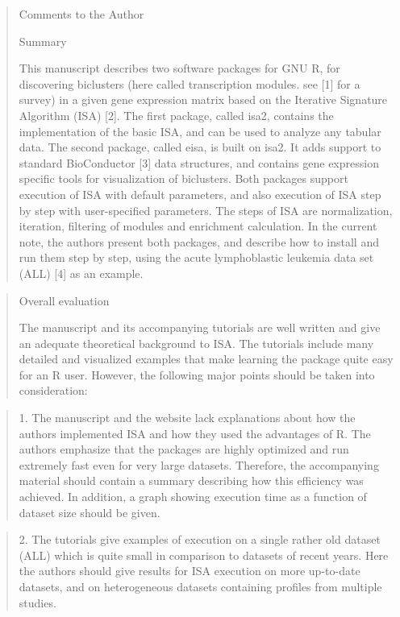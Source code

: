 \documentclass[a4paper]{article}
\begin{document}
\begin{quote}
Comments to the Author

Summary

This manuscript describes two software packages for GNU R, for
discovering biclusters (here called transcription modules. see [1] for
a survey) in a given gene expression matrix based on the Iterative
Signature Algorithm (ISA) [2]. The first package, called isa2,
contains the implementation of the basic ISA, and can be used to
analyze any tabular data. The second package, called eisa, is built on
isa2. It adds support to standard BioConductor [3] data structures,
and contains gene expression specific tools for visualization of
biclusters. Both packages support execution of ISA with default
parameters, and also execution of ISA step by step with user-specified
parameters. The steps of ISA are normalization, iteration, filtering
of modules and enrichment calculation. In the current note, the
authors present both packages, and describe how to install and run
them step by step, using the acute lymphoblastic leukemia data set
(ALL) [4] as an example. 
\end{quote}

\begin{quote}
Overall evaluation

The manuscript and its accompanying tutorials are well written and
give an adequate theoretical background to ISA. The tutorials include
many detailed and visualized examples that make learning the package
quite easy for an R user. However, the following major points should
be taken into consideration: 
\end{quote}

\begin{quote}
1.      The manuscript and the website lack explanations about how the
authors implemented ISA and how they used the advantages of R. The
authors emphasize that the packages are highly optimized and run
extremely fast even for very large datasets.  Therefore, the
accompanying material should contain a summary describing how this
efficiency was achieved. In addition, a graph showing execution time
as a function of dataset size should be given. 
\end{quote}

\begin{quote}
2.      The tutorials give examples of execution on a single rather
old dataset (ALL) which is quite small in comparison to datasets of
recent years. Here the authors should give results for ISA execution
on more up-to-date datasets, and on heterogeneous datasets containing
profiles from multiple studies. 
\end{quote}
\end{document}
